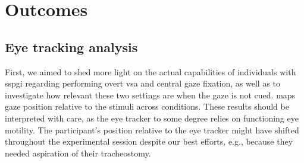 \section{Outcomes}

\subsection{Eye tracking analysis}
\label{sec:patients/outcomes/gaze}

First, we aimed to shed more light on the actual capabilities of individuals
with \ac{sspgi} regarding performing overt \ac{vsa} and central gaze
fixation, as well as to investigate how relevant these two settings are when the
gaze is not cued.
 maps gaze position relative to the stimuli
across conditions.
These results should be interpreted with care, as the eye tracker to some
degree relies on functioning eye motility.
The participant's position relative to the eye tracker might have shifted
throughout the experimental session despite our best efforts, e.g., because they needed aspiration of their
tracheostomy.

